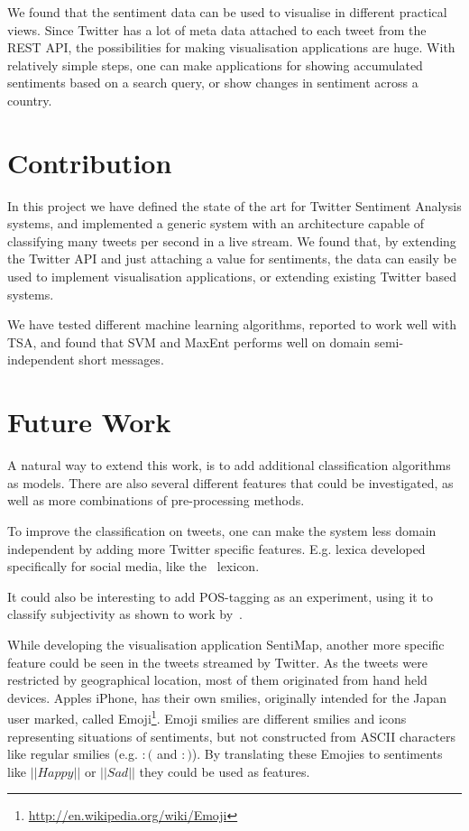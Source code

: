 We found that the sentiment data can be used to visualise in different practical views. Since Twitter has a lot of meta data attached to each tweet from the REST API, the possibilities for making visualisation applications are huge. With relatively simple steps, one can make applications for showing accumulated sentiments based on a search query, or show changes in sentiment across a country.

\section{Contribution}

In this project we have defined the state of the art for Twitter Sentiment Analysis systems, and implemented a generic system with an architecture capable of classifying many tweets per second in a live stream. We found that, by extending the Twitter API and just attaching a value for sentiments, the data can easily be used to implement visualisation applications, or extending existing Twitter based systems. 

We have tested different machine learning algorithms, reported to work well with TSA, and found that SVM and MaxEnt performs well on domain semi-independent short messages. 

\section{Future Work}

A natural way to extend this work, is to add additional classification algorithms as models. There are also several different features that could be investigated, as well as more combinations of pre-processing methods.

To improve the classification on tweets, one can make the system less domain independent by adding more Twitter specific features. E.g. lexica developed specifically for social media, like the~\citet{article:afinn} lexicon.

It could also be interesting to add POS-tagging as an experiment, using it to classify subjectivity as shown to work by~\citet{article:pak}.

While developing the visualisation application SentiMap, another more specific feature could be seen in the tweets streamed by Twitter. As the tweets were restricted by geographical location, most of them originated from hand held devices. Apples iPhone, has their own smilies, originally intended for the Japan user marked, called Emoji\footnote{\url{http://en.wikipedia.org/wiki/Emoji}}. Emoji smilies are different smilies and icons representing situations of sentiments, but not constructed from ASCII characters like regular smilies (e.g. $:($ and $:)$). By translating these Emojies to sentiments like $||Happy||$ or $||Sad||$ they could be used as features.